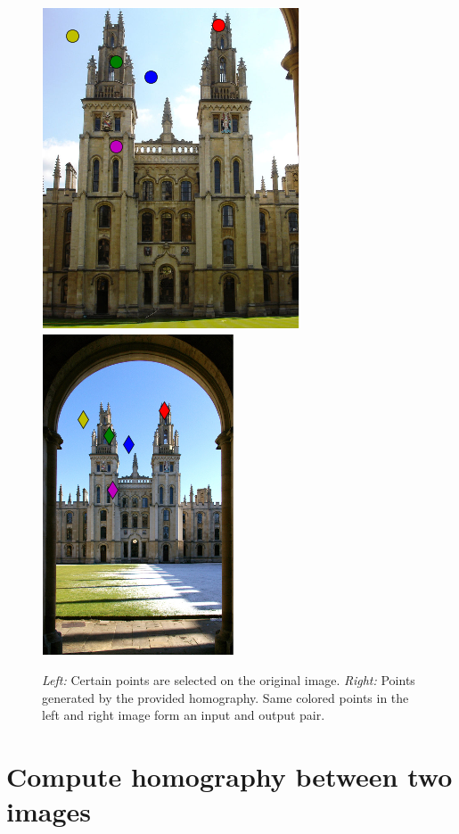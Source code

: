 \documentclass[a4paper,10pt,twoside,draft]{article}
\begin{document}
\begin{figure}
  \begin{center}
    \includegraphics[width=.48\textwidth]{points1}
    \includegraphics[width=.48\textwidth]{points2}
  \end{center}
  \caption{\emph{Left:} Certain points are selected on the original image. \emph{Right:} Points generated by the provided homography. Same colored points in the left and right image form an input and output pair.}
  \label{fig:points}
\end{figure}

\section{Compute homography between two images}
\end{document}
